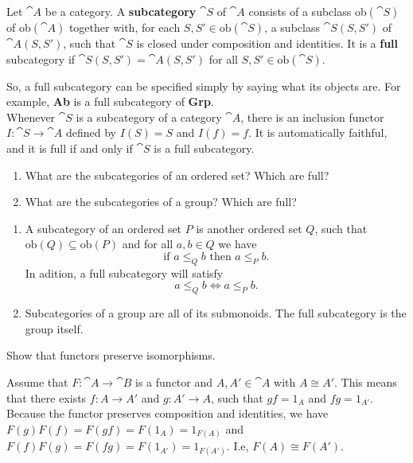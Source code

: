 \documentclass[11pt,a4paper]{article}
\begin{document}
\begin{definition}
    Let $\cat{A}$ be a category. A \textbf{subcategory} $\cat{S}$ of $\cat{A}$ consists of a subclass ob$(\cat{S})$ of ob$(\cat{A})$ together with, for each $S,S' \in \text{ob}(\cat{S})$, a subclass $\cat{S}(S,S')$ of $\cat{A}(S,S')$, such that $\cat{S}$ is closed under composition and identities. It is a \textbf{full} subcategory if $\cat{S}(S,S')=\cat{A}(S,S')$ for all $S,S'\in \text{ob}(\cat{S})$.
\end{definition}
So, a full subcategory can be specified simply by saying what its objects are. For example, \textbf{Ab} is a full subcategory of \textbf{Grp}.\\
Whenever $\cat{S}$ is a subcategory of a category $\cat{A}$, there is an inclusion functor $I:\cat{S}\to \cat{A}$ defined by $I(S)=S$ and $I(f)=f$. It is automatically faithful, and it is full if and only if $\cat{S}$ is a full subcategory.

\begin{exercise}
    \begin{enumerate}[label=(\alph*)]
        \item What are the subcategories of an ordered set? Which are full?
        \item What are the subcategories of a group? Which are full?
    \end{enumerate}
\end{exercise}
\begin{solution}\leavevmode
    \begin{enumerate}[label=(\alph*)]
        \item A subcategory of an ordered set $P$ is another ordered set $Q$, such that\\ $\text{ob}(Q) \subseteq \text{ob}(P)$ and for all $a,b\in Q$ we have
        $$\text{if } a \leq_Q b \text{ then } a \leq_P b.$$
        In adition, a full subcategory will satisfy
        $$a \leq_Q b \Longleftrightarrow a \leq_P b.$$
        \item Subcategories of a group are all of its submonoids. The full subcategory is the group itself.
    \end{enumerate}
\end{solution}

\begin{exercise}
    Show that functors preserve isomorphisms.
\end{exercise}
\begin{solution}
    Assume that $F: \cat{A}\to \cat{B}$ is a functor and $A,A'\in \cat{A}$ with $A\cong A'$. This means that there exists $f: A\to A'$ and $g: A'\to A$, such that $gf = 1_A$ and $fg = 1_{A'}$. Because the functor preserves composition and identities, we have $F(g)F(f) = F(gf) = F(1_A) = 1_{F(A)}$ and $F(f)F(g) = F(fg) = F(1_{A'}) = 1_{F(A')}$. I.e, $F(A)\cong F(A')$.
\end{solution}
\end{document}
